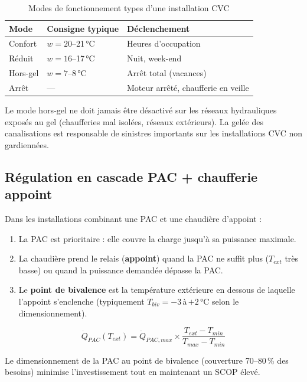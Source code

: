 \begin{table}[H]
  \centering
  \caption{Modes de fonctionnement types d'une installation CVC}
  \begin{tabular}{p{3cm}p{3cm}p{4.5cm}}
    \toprule
    Mode & Consigne typique & Déclenchement \\
    \midrule
    Confort & $w = 20$--21\,°C & Heures d'occupation \\
    Réduit & $w = 16$--17\,°C & Nuit, week-end \\
    Hors-gel & $w = 7$--8\,°C & Arrêt total (vacances) \\
    Arrêt & — & Moteur arrêté, chaufferie en veille \\
    \bottomrule
  \end{tabular}
\end{table}

\begin{attention}
  Le mode hors-gel ne doit jamais être désactivé sur les réseaux hydrauliques exposés au gel (chaufferies mal isolées, réseaux extérieurs). La gelée des canalisations est responsable de sinistres importants sur les installations CVC non gardiennées.
\end{attention}

\subsection{Régulation en cascade PAC + chaufferie appoint}

Dans les installations combinant une PAC et une chaudière d'appoint :
\begin{enumerate}
  \item La PAC est prioritaire : elle couvre la charge jusqu'à sa puissance maximale.
  \item La chaudière prend le relais (\textbf{appoint}) quand la PAC ne suffit plus ($T_{ext}$ très basse) ou quand la puissance demandée dépasse la PAC.
  \item Le \textbf{point de bivalence} est la température extérieure en dessous de laquelle l'appoint s'enclenche (typiquement $T_{biv} = -3$\,à\,$+2$\,°C selon le dimensionnement).
\end{enumerate}

\begin{equation}
  \dot{Q}_{PAC}(T_{ext}) = \dot{Q}_{PAC,max} \times \frac{T_{ext} - T_{min}}{T_{max} - T_{min}}
\end{equation}

Le dimensionnement de la PAC au point de bivalence (couverture 70--80\,\% des besoins) minimise l'investissement tout en maintenant un SCOP élevé.

